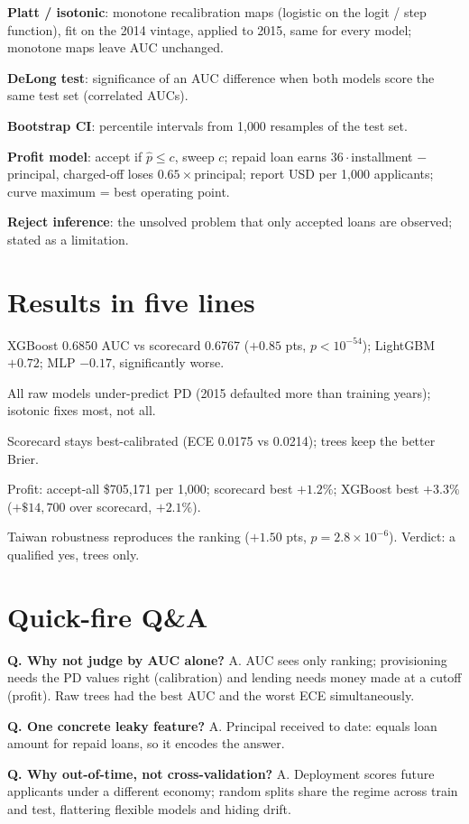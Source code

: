 \documentclass[a4paper,10pt]{article}
\newcommand{\term}[1]{\textbf{#1}:}
\begin{document}
\term{Platt / isotonic} monotone recalibration maps (logistic on the logit / step function), fit on the 2014 vintage, applied to 2015, same for every model; monotone maps leave AUC unchanged.

\term{DeLong test} significance of an AUC difference when both models score the same test set (correlated AUCs).

\term{Bootstrap CI} percentile intervals from 1{,}000 resamples of the test set.

\term{Profit model} accept if $\hat p\le c$, sweep $c$; repaid loan earns $36\cdot$installment $-$ principal, charged-off loses $0.65\times$principal; report USD per 1{,}000 applicants; curve maximum = best operating point.

\term{Reject inference} the unsolved problem that only accepted loans are observed; stated as a limitation.

\section*{Results in five lines}

XGBoost 0.6850 AUC vs scorecard 0.6767 ($+0.85$ pts, $p<10^{-54}$); LightGBM $+0.72$; MLP $-0.17$, significantly worse.

All raw models under-predict PD (2015 defaulted more than training years); isotonic fixes most, not all.

Scorecard stays best-calibrated (ECE 0.0175 vs 0.0214); trees keep the better Brier.

Profit: accept-all \$705{,}171 per 1{,}000; scorecard best $+1.2\%$; XGBoost best $+3.3\%$ ($+\$14{,}700$ over scorecard, $+2.1\%$).

Taiwan robustness reproduces the ranking ($+1.50$ pts, $p=2.8\times10^{-6}$). Verdict: a qualified yes, trees only.

\section*{Quick-fire Q\&A}

\textbf{Q. Why not judge by AUC alone?} A. AUC sees only ranking; provisioning needs the PD values right (calibration) and lending needs money made at a cutoff (profit). Raw trees had the best AUC and the worst ECE simultaneously.

\textbf{Q. One concrete leaky feature?} A. Principal received to date: equals loan amount for repaid loans, so it encodes the answer.

\textbf{Q. Why out-of-time, not cross-validation?} A. Deployment scores future applicants under a different economy; random splits share the regime across train and test, flattering flexible models and hiding drift.
\end{document}
